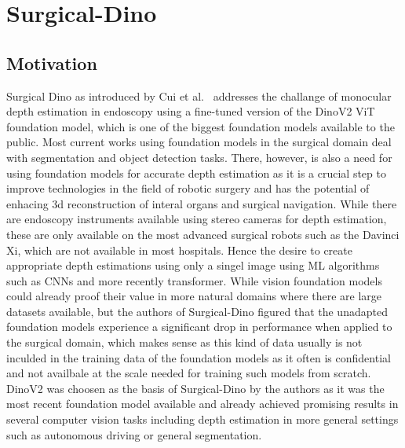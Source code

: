 \section{Surgical-Dino}

\subsection*{Motivation}
Surgical Dino as introduced by Cui et al.~\cite{Cui2024} addresses the challange of monocular depth estimation in endoscopy using a fine-tuned version of the DinoV2 ViT foundation model, which is one of the biggest foundation models available to the public.
Most current works using foundation models in the surgical domain deal with segmentation and object detection tasks.
There, however, is also a need for using foundation models for accurate depth estimation as it is a crucial step to improve technologies in the field of robotic surgery and has the potential of enhacing 3d reconstruction of interal organs and surgical navigation.
While there are endoscopy instruments available using stereo cameras for depth estimation, these are only available on the most advanced surgical robots such as the Davinci Xi, which are not available in most hospitals.
Hence the desire to create appropriate depth estimations using only a singel image using ML algorithms such as CNNs and more recently transformer.
While vision foundation models could already proof their value in more natural domains where there are large datasets available, but the authors of Surgical-Dino figured that the unadapted foundation models experience a significant drop in performance when applied to the surgical domain, which makes sense as this kind of data usually is not inculded in the training data of the foundation models as it often is confidential and not availbale at the scale needed for training such models from scratch.
DinoV2 was choosen as the basis of Surgical-Dino by the authors as it was the most recent foundation model available and already achieved promising results in several computer vision tasks including depth estimation in more general settings such as autonomous driving or general segmentation.

